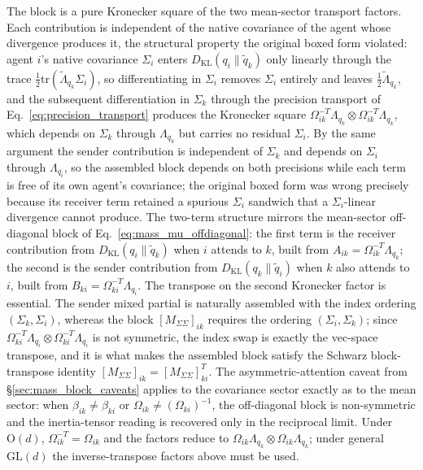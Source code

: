 \documentclass[11pt]{article}
\begin{document}
The block is a pure Kronecker square of the two mean-sector transport factors. Each contribution is independent of the native covariance of the agent whose divergence produces it, the structural property the original boxed form violated: agent $i$'s native covariance $\Sigma_i$ enters $D_{\mathrm{KL}}(q_i \| \tilde{q}_k)$ only linearly through the trace $\frac{1}{2}\mathrm{tr}(\tilde{\Lambda}_{q_k}\Sigma_i)$, so differentiating in $\Sigma_i$ removes $\Sigma_i$ entirely and leaves $\frac{1}{2}\tilde{\Lambda}_{q_k}$, and the subsequent differentiation in $\Sigma_k$ through the precision transport of Eq.~\eqref{eq:precision_transport} produces the Kronecker square $\Omega_{ik}^{-T}\Lambda_{q_k} \otimes \Omega_{ik}^{-T}\Lambda_{q_k}$, which depends on $\Sigma_k$ through $\Lambda_{q_k}$ but carries no residual $\Sigma_i$. By the same argument the sender contribution is independent of $\Sigma_k$ and depends on $\Sigma_i$ through $\Lambda_{q_i}$, so the assembled block depends on both precisions while each term is free of its own agent's covariance; the original boxed form was wrong precisely because its receiver term retained a spurious $\Sigma_i$ sandwich that a $\Sigma_i$-linear divergence cannot produce. The two-term structure mirrors the mean-sector off-diagonal block of Eq.~\eqref{eq:mass_mu_offdiagonal}: the first term is the receiver contribution from $D_{\mathrm{KL}}(q_i \| \tilde{q}_k)$ when $i$ attends to $k$, built from $A_{ik} = \Omega_{ik}^{-T}\Lambda_{q_k}$; the second is the sender contribution from $D_{\mathrm{KL}}(q_k \| \tilde{q}_i)$ when $k$ also attends to $i$, built from $B_{ki} = \Omega_{ki}^{-T}\Lambda_{q_i}$. The transpose on the second Kronecker factor is essential. The sender mixed partial is naturally assembled with the index ordering $(\Sigma_k, \Sigma_i)$, whereas the block $[M_{\Sigma\Sigma}]_{ik}$ requires the ordering $(\Sigma_i, \Sigma_k)$; since $\Omega_{ki}^{-T}\Lambda_{q_i} \otimes \Omega_{ki}^{-T}\Lambda_{q_i}$ is not symmetric, the index swap is exactly the vec-space transpose, and it is what makes the assembled block satisfy the Schwarz block-transpose identity $[M_{\Sigma\Sigma}]_{ik} = [M_{\Sigma\Sigma}]_{ki}^T$. The asymmetric-attention caveat from \S\ref{sec:mass_block_caveats} applies to the covariance sector exactly as to the mean sector: when $\beta_{ik} \neq \beta_{ki}$ or $\Omega_{ik} \neq (\Omega_{ki})^{-1}$, the off-diagonal block is non-symmetric and the inertia-tensor reading is recovered only in the reciprocal limit. Under $\mathrm{O}(d)$, $\Omega_{ik}^{-T} = \Omega_{ik}$ and the factors reduce to $\Omega_{ik}\Lambda_{q_k} \otimes \Omega_{ik}\Lambda_{q_k}$; under general $\mathrm{GL}(d)$ the inverse-transpose factors above must be used.
\end{document}
